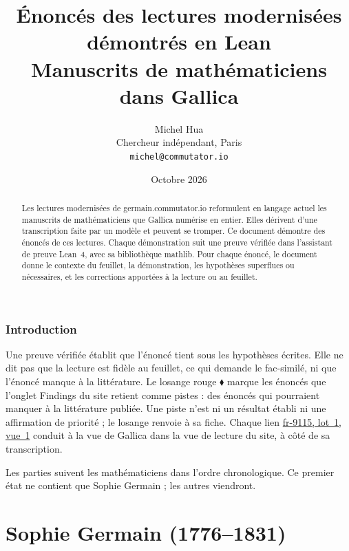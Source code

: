 \documentclass[11pt]{article}
\title{\Large Énoncés des lectures modernisées démontrés en Lean\\[4pt]\large Manuscrits de mathématiciens dans Gallica}
\author{Michel Hua\\ \small Chercheur indépendant, Paris\\ \small \texttt{michel@commutator.io}}
\date{\small Octobre 2026}
\newcommand{\vue}[3]{\href{https://germain.commutator.io/archive/\##1/#2/fr/#3}{#1, lot~#2, vue~#3}}
\theoremstyle{plain}
\theoremstyle{definition}
\theoremstyle{remark}
\begin{document}
\maketitle

\begin{abstract}
\noindent Les lectures modernisées de germain.commutator.io reformulent en langage actuel les manuscrits de mathématiciens que Gallica numérise en entier. Elles dérivent d'une transcription faite par un modèle et peuvent se tromper. Ce document démontre des énoncés de ces lectures. Chaque démonstration suit une preuve vérifiée dans l'assistant de preuve Lean~4, avec sa bibliothèque mathlib. Pour chaque énoncé, le document donne le contexte du feuillet, la démonstration, les hypothèses superflues ou nécessaires, et les corrections apportées à la lecture ou au feuillet.
\end{abstract}

\tableofcontents

\section*{Introduction}

Une preuve vérifiée établit que l'énoncé tient sous les hypothèses écrites. Elle ne dit pas que la lecture est fidèle au feuillet, ce qui demande le fac-similé, ni que l'énoncé manque à la littérature. Le losange rouge \textcolor{piste}{\ensuremath{\blacklozenge}} marque les énoncés que l'onglet Findings du site retient comme pistes : des énoncés qui pourraient manquer à la littérature publiée. Une piste n'est ni un résultat établi ni une affirmation de priorité ; le losange renvoie à sa fiche. Chaque lien \vue{fr-9115}{1}{1} conduit à la vue de Gallica dans la vue de lecture du site, à côté de sa transcription.

Les parties suivent les mathématiciens dans l'ordre chronologique. Ce premier état ne contient que Sophie Germain ; les autres viendront.

\part{Sophie Germain (1776--1831)}





\end{document}
